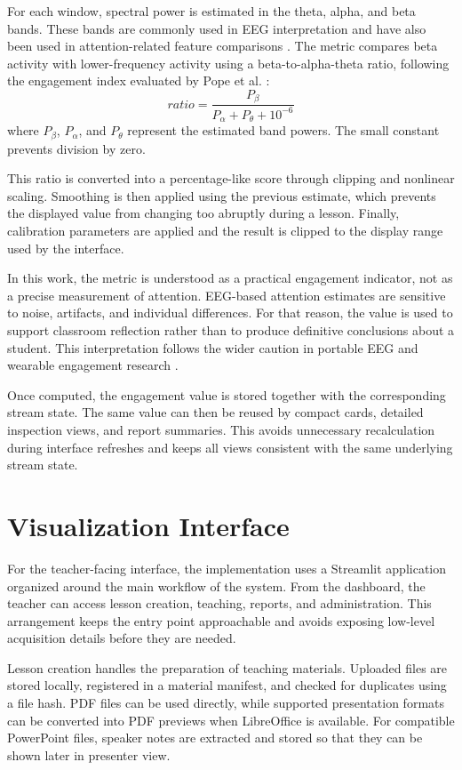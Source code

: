 For each window, spectral power is estimated in the theta, alpha, and beta bands. These bands are commonly used in EEG interpretation and have also been used in attention-related feature comparisons \cite{Niedermeyer2005,Liang2022}. The metric compares beta activity with lower-frequency activity using a beta-to-alpha-theta ratio, following the engagement index evaluated by Pope et al. \cite{Pope1995}:
\[
ratio = \frac{P_{\beta}}{P_{\alpha} + P_{\theta} + 10^{-6}}
\]
where \(P_{\beta}\), \(P_{\alpha}\), and \(P_{\theta}\) represent the estimated band powers. The small constant prevents division by zero.


This ratio is converted into a percentage-like score through clipping and nonlinear scaling. Smoothing is then applied using the previous estimate, which prevents the displayed value from changing too abruptly during a lesson. Finally, calibration parameters are applied and the result is clipped to the display range used by the interface.


In this work, the metric is understood as a practical engagement indicator, not as a precise measurement of attention. EEG-based attention estimates are sensitive to noise, artifacts, and individual differences. For that reason, the value is used to support classroom reflection rather than to produce definitive conclusions about a student. This interpretation follows the wider caution in portable EEG and wearable engagement research \cite{Xu2018,BustosLopez2022}.


Once computed, the engagement value is stored together with the corresponding stream state. The same value can then be reused by compact cards, detailed inspection views, and report summaries. This avoids unnecessary recalculation during interface refreshes and keeps all views consistent with the same underlying stream state.

\section{Visualization Interface}\label{sect:visint}
For the teacher-facing interface, the implementation uses a Streamlit application organized around the main workflow of the system. From the dashboard, the teacher can access lesson creation, teaching, reports, and administration. This arrangement keeps the entry point approachable and avoids exposing low-level acquisition details before they are needed.


Lesson creation handles the preparation of teaching materials. Uploaded files are stored locally, registered in a material manifest, and checked for duplicates using a file hash. PDF files can be used directly, while supported presentation formats can be converted into PDF previews when LibreOffice is available. For compatible PowerPoint files, speaker notes are extracted and stored so that they can be shown later in presenter view.


